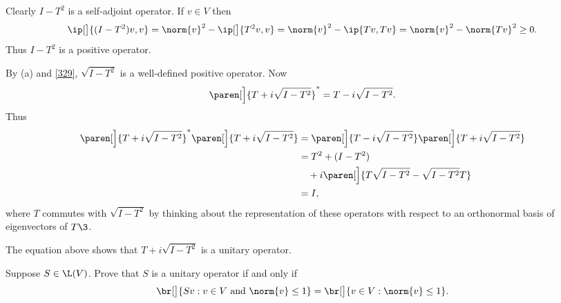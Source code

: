 \begin{Solution}
\begin{subtheorem}
\item
Clearly $I - T^2$ is a self-adjoint operator. If $v \in V$ then
\[
\ip[\big]{ (I - T^2) v, v } = \norm{v}^2 - \ip[\big]{T^2 v, v} = \norm{v}^2 - \ip{Tv, Tv} = \norm{v}^2 - \norm{Tv}^2 \ge 0.
\]
Thus $I - T^2$ is a positive operator.
\item
By (a) and \ref{329}, $\sqrt{I - T^2}$ is a well-defined positive operator. Now
\[
\paren[\Big]{T + i \sqrt{I - T^2}}^* = T - i \sqrt{I - T^2}.
\]
Thus
\begin{align*}
\paren[\Big]{T + i \sqrt{I - T^2}}^* \paren[\Big]{T + i \sqrt{I - T^2}} &= \paren[\Big]{T - i \sqrt{I - T^2}} \paren[\Big]{T + i \sqrt{I - T^2}} \\
&= T^2 + (I - T^2) \\
&\quad {}+ i\paren[\Big]{ T \sqrt{I - T^2} - \sqrt{I - T^2} T } \\
&= I,
\end{align*}
where $T$ commutes with $\sqrt{I - T^2}$ by thinking about the representation of these operators with respect to an orthonormal basis of eigenvectors of $T\3$.

The equation above shows that $T + i \sqrt{I - T^2}$ is a unitary operator.
\end{subtheorem}
\end{Solution}

\exercise
Suppose $S \in \L(V)$. Prove that $S$ is a unitary operator if and only if \label{IsoBall}
\[
\br[\big]{ Sv : v \in V \text{ and } \norm{v} \le 1} = \br[\big]{ v \in V: \norm{v} \le 1}.
\]
\exercisedisplayend


